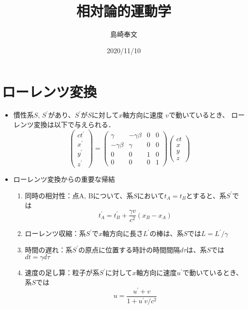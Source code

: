 \documentclass[11pt,a4j]{jarticle}
\title{相対論的運動学}
\author{島崎奉文}
\date{2020/11/10}
\begin{document}
\maketitle

\section{ローレンツ変換}
\begin{itemize}
\item 慣性系$S, \, S^{\prime} $があり、$ S^{\prime} $が$ S $に対して$x$軸方向に速度 $v$で動いているとき、
ローレンツ変換は以下で与えられる．
	\[
		\left(
		\begin{array}{cccc}
			ct^{\prime} \\
			x^{\prime} \\
			y^{\prime} \\
			z^{\prime}
		\end{array}
 		\right) = \left(
		\begin{array}{cccc}
			\gamma & -\gamma \beta & 0 & 0 \\
			-\gamma \beta & \gamma & 0 & 0 \\
			0 & 0 & 1 & 0 \\
			0 & 0 & 0 & 1
		\end{array}
		\right) \left(
		\begin{array}{cccc}
			ct \\
			x \\
			y \\
			z
		\end{array}
		\right)
	\]
\item ローレンツ変換からの重要な帰結
	\begin{enumerate}
	\item 同時の相対性：点A, Bについて、系$S$において$t_A = t_B$とすると、系$S^{\prime}$では
		\[
			t_A^{\prime} = t_B^{\prime} + \frac{\gamma v}{c^2}(x_B - x_A)
		\]
	\item ローレンツ収縮：系$S^{\prime}$で$x$軸方向に長さ$L^{\prime}$の棒は、系$S$では$L = L^{\prime} / \gamma$
	\item 時間の遅れ：系$S^{\prime}$の原点に位置する時計の時間間隔$d\tau$は、系$S$では$dt = \gamma d\tau$
	\item 速度の足し算：粒子が系$S^{\prime}$に対して$x$軸方向に速度$u^{\prime}$で動いているとき、系$S$では
		\[
			u = \frac{u^{\prime}+v}{1+u^{\prime}v/c^2}
		\]
	
	\end{enumerate}
\end{itemize}
\end{document}
